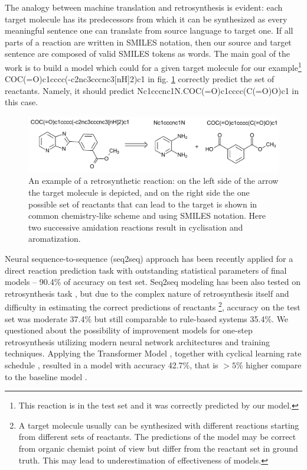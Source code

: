 \documentclass{article}
\begin{document}
The analogy between machine translation and retrosynthesis is evident: each target molecule has 
its predecessors from which it can be synthesized as every meaningful sentence one can translate 
from source language to target one. If all parts of a reaction are written in SMILES notation, 
then our source and target sentence are composed of valid SMILES tokens as words. 
The main goal of the work is to build a model which could for a given target molecule for our example\footnote{
This reaction is in the test set and it was correctly predicted  by our model.} COC(=O)c1cccc(-c2nc3cccnc3[nH]2)c1 in fig. \ref{fig:example-reaction}
correctly predict the set of reactants. Namely, it should predict Nc1cccnc1N.COC(=O)c1cccc(C(=O)O)c1 in this case.

\begin{figure}
  \centering
  \includegraphics[scale=0.87]{images/example-reaction.pdf}
  \caption{An example of a retrosynthetic reaction: on the left side of the arrow the target molecule is depicted, and on the right side the one possible set of reactants that can lead to the target is shown in common chemistry-like scheme and using SMILES notation. Here two successive amidation reactions result in cyclisation and aromatization.}
  \label{fig:example-reaction}
\end{figure}

Neural sequence-to-sequence (seq2seq) approach has been recently applied for a direct reaction 
prediction task \cite{SchwallerTranslation,SchwallerTransformer} with outstanding statistical 
parameters of final models -- 90.4\% of accuracy on test set. Seq2seq modeling has been also tested on 
retrosynthesis task \cite{Pande}, but due to the complex nature of retrosynthesis itself 
and difficulty in estimating the correct predictions of reactants
\footnote{A target molecule usually can be synthesized with different reactions starting from different sets of reactants. 
The predictions of the model may be correct from organic chemist point of view but differ from 
the reactant set in ground truth. This may lead to underestimation of effectiveness of models.}, 
accuracy on the test set was moderate 37.4\% but still comparable to rule-based systems 35.4\%. 
We questioned about the possibility of improvement models for one-step retrosynthesis utilizing modern neural network architectures 
and training techniques. Applying the Transformer Model \cite{Transformer}, 
together with cyclical learning rate schedule \cite{TransformerTips}, 
resulted in a model with accuracy 42.7\%, 
that is  $>5$\% higher compare to the baseline model \cite{Pande}.  
\end{document}
